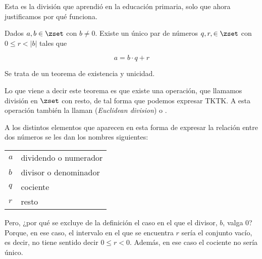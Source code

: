 


Esta es la división que aprendió en la educación primaria, solo que ahora
justificamos por qué funciona.

\begin{theorem}%
\label{th-div-entera-con-resto}
  Dados $a, b \in \zset$ con $b \neq 0$. Existe un único par de números $q,
  r, \in \zset$ con $0 \leq r < |b|$ tales que

  $$ a = b \cdot q + r $$
\end{theorem}

Se trata de un teorema de existencia y unicidad.

\iffalse
Otra opción sería poner $0 \leq r \leq |b-1|$.
\fi

Lo que viene a decir este teorema es que existe una operación, que llamamos
división en $\zset$ con resto, de tal forma que podemos expresar TKTK. A
esta operación también la llaman  (\emph{Euclidean
division}) o .\footnotemark


A los distintos elementos que aparecen en esta forma de expresar la relación
entre dos números se les dan los nombres siguientes:

\begin{center}
\begin{tabular}{l|l}
  $a$ & dividendo o numerador \\
  $b$ & divisor o denominador \\
  $q$ & cociente \\
  $r$ & resto
\end{tabular}
\end{center}

Pero, ¿por qué se excluye de la definición el caso en el que el divisor,
$b$, valga 0? Porque, en ese caso, el intervalo en el que se encuentra $r$
sería el conjunto vacío, es decir, no tiene sentido decir $0 \leq r < 0$.
Además, en ese caso el cociente no sería único.

